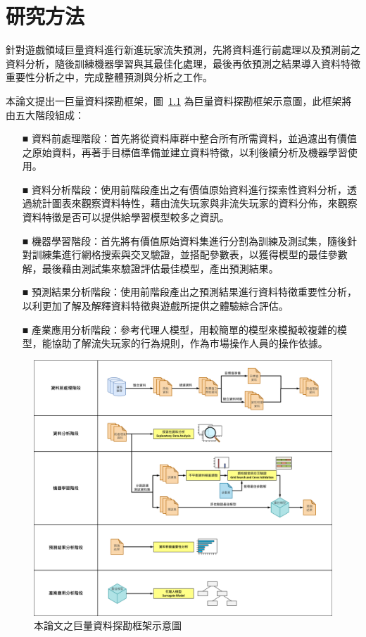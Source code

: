 \chapter{研究方法}
\label{cha:Method}

針對遊戲領域巨量資料進行新進玩家流失預測，先將資料進行前處理以及預測前之資料分析，隨後訓練機器學習與其最佳化處理，最後再依預測之結果導入資料特徵重要性分析之中，完成整體預測與分析之工作。

本論文提出一巨量資料探勘框架，圖~\ref{fig:Image_Framework} 為巨量資料探勘框架示意圖，此框架將由五大階段組成：

\begin{itemize}
  \item[■] 資料前處理階段：首先將從資料庫群中整合所有所需資料，並過濾出有價值之原始資料，再著手目標值準備並建立資料特徵，以利後續分析及機器學習使用。
  \item[■] 資料分析階段：使用前階段產出之有價值原始資料進行探索性資料分析，透過統計圖表來觀察資料特性，藉由流失玩家與非流失玩家的資料分佈，來觀察資料特徵是否可以提供給學習模型較多之資訊。
  \item[■] 機器學習階段：首先將有價值原始資料集進行分割為訓練及測試集，隨後針對訓練集進行網格搜索與交叉驗證，並搭配參數表，以獲得模型的最佳參數解，最後藉由測試集來驗證評估最佳模型，產出預測結果。
  \item[■] 預測結果分析階段：使用前階段產出之預測結果進行資料特徵重要性分析，以利更加了解及解釋資料特徵與遊戲所提供之體驗綜合評估。
  \item[■] 產業應用分析階段：參考代理人模型，用較簡單的模型來模擬較複雜的模型，能協助了解流失玩家的行為規則，作為市場操作人員的操作依據。
\end{itemize} 

\begin{figure}[!htb]
  \begin{center}
    \includegraphics[width=1\textwidth]{figures/Image_Framework.png}
    \caption[本論文之巨量資料探勘框架示意圖]{本論文之巨量資料探勘框架示意圖}
    \label{fig:Image_Framework}
  \end{center}
\end{figure}
\newpage

